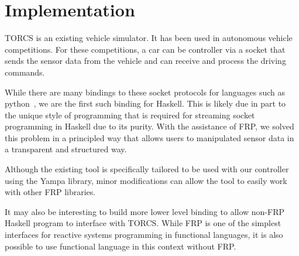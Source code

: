 \section{Implementation}

TORCS is an existing vehicle simulator.
It has been used in autonomous vehicle competitions.
For these competitions, a car can be controller via a socket that sends the sensor data from the vehicle and can receive and process the driving commands.

While there are many bindings to these socket protocols for languages such as python~\cite{x,y,z}, we are the first such binding for Haskell.
This is likely due in part to the unique style of programming that is required for streaming socket programming in Haskell due to its purity.
With the assistance of FRP, we solved this problem in a principled way that allows users to manipulated sensor data in a transparent and structured way.


Although the existing tool is specifically tailored to be used with our controller using the Yampa library,
  minor modifications can allow the tool to easily work with other FRP libraries.

It may also be interesting to build more lower level binding to allow non-FRP Haskell program to interface with TORCS.
While FRP is one of the simplest interfaces for reactive systems programming in functional languages, it is also possible to use functional language in this context without FRP.

